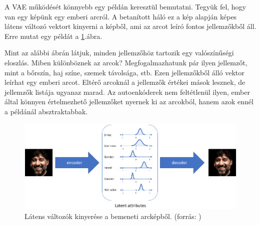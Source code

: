 


A VAE működését könnyebb egy példán keresztül bemutatni. Tegyük fel, hogy van egy képünk egy emberi arcról. A betanított háló ez a kép alapján képes látens változó vektort kinyerni a képből, ami az arcot leíró fontos jellemzőkből áll. Erre mutat egy példát a \ref{fig:vae_face}.ábra.


Mint az alábbi ábrán látjuk, minden jellemzőhöz tartozik egy valószínűségi eloszlás. Miben különböznek az arcok? Megfogalmazhatunk pár ilyen jellemzőt, mint a bőrszín, haj színe, szemek távolsága, stb. Ezen jellemzőkből álló vektor leírhat egy emberi arcot. Eltérő arcoknál a jellemzők értékei mások lesznek, de jellemzők listája ugyanaz marad. Az autoenkóderek nem feltétlenül ilyen, ember által könnyen értelmezhető jellemzőket nyernek ki az arcokból, hanem azok ennél a példánál absztraktabbak.

\begin{figure}[ht]
	\centering
	\includegraphics[width=1\columnwidth]{figures/autoenc_latent.png}
	\caption{Látens változók kinyerése a bemeneti arcképből. (forrás: \cite{vae_latent})}
	\label{fig:vae_face}
\end{figure}

